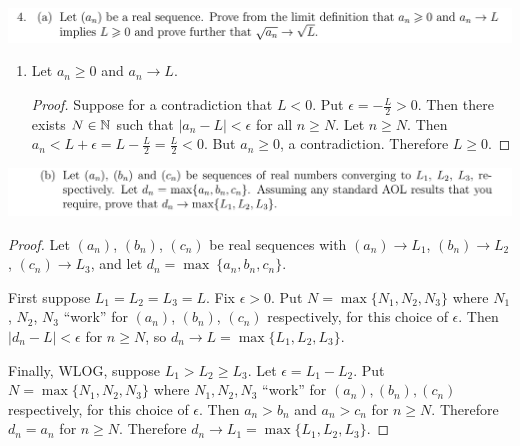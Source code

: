 \documentclass[12pt]{article}
\begin{document}
\newpage
\subsection{}
\begin{mdframed}
\includegraphics[width=400pt]{img/oxford-M2-analysis-I-4-4-a.png}
\end{mdframed}
\begin{enumerate}[label=(\alph*)]
\item Let $a_n \geq 0$ and $a_n \to L$.
  \begin{proof}
    Suppose for a contradiction that $L < 0$. Put $\epsilon = -\frac{L}{2} > 0$. Then there exists
    $N \in \mathbb{N}$ such that $|a_n - L| < \epsilon$ for all $n \geq N$. Let $n \geq N$. Then
    $a_n < L + \epsilon = L - \frac{L}{2} = \frac{L}{2} < 0$. But $a_n \geq 0$, a
    contradiction. Therefore $L \geq 0$.
  \end{proof}
\end{enumerate}

\begin{mdframed}
\includegraphics[width=400pt]{img/oxford-M2-analysis-I-4-4-b.png}
\end{mdframed}
\begin{proof}
  Let $(a_n)$, $(b_n)$, $(c_n)$ be real sequences with $(a_n) \to L_1$, $(b_n) \to L_2$,
  $(c_n) \to L_3$, and let $d_n = \max ~ \{a_n, b_n, c_n\}$.

  First suppose $L_1 = L_2 = L_3 = L$. Fix $\epsilon > 0$. Put $N = \max\{N_1, N_2, N_3\}$ where
  $N_1$, $N_2$, $N_3$ ``work'' for $(a_n)$, $(b_n)$, $(c_n)$ respectively, for this choice of
  $\epsilon$. Then $|d_n - L| < \epsilon$ for $n \geq N$, so $d_n \to L = \max\{L_1, L_2, L_3\}$.

  Finally, WLOG, suppose $L_1 > L_2 \geq L_3$. Let $\epsilon = L_1 - L_2$. Put
  $N = \max\{N_1, N_2, N_3\}$ where $N_1, N_2, N_3$ ``work'' for $(a_n), (b_n), (c_n)$
  respectively, for this choice of $\epsilon$. Then $a_n > b_n$ and $a_n > c_n$ for $n \geq
  N$. Therefore $d_n = a_n$ for $n \geq N$. Therefore $d_n \to L_1 = \max\{L_1, L_2, L_3\}$.

\end{proof}
\end{document}

